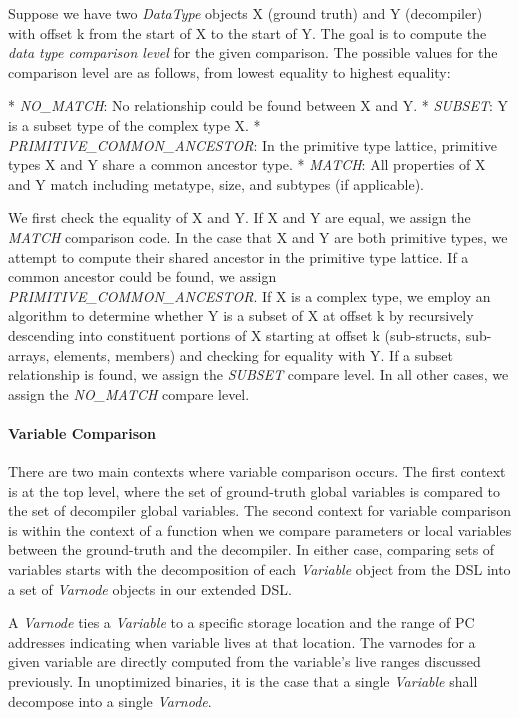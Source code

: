 \documentclass[conference]{IEEEtran}
\begin{document}

Suppose we have two \emph{DataType} objects X (ground truth) and Y (decompiler) with offset k from the start of X to the start of Y. The goal is to compute the \emph{data type comparison level} for the given comparison. The possible values for the comparison level are as follows, from lowest equality to highest equality:

* \emph{NO\_MATCH}: No relationship could be found between X and Y.
* \emph{SUBSET}: Y is a subset type of the complex type X.
* \emph{PRIMITIVE\_COMMON\_ANCESTOR}: In the primitive type lattice, primitive types X and Y share a common ancestor type.
* \emph{MATCH}: All properties of X and Y match including metatype, size, and subtypes (if applicable).

We first check the equality of X and Y. If X and Y are equal, we assign the \emph{MATCH} comparison code. In the case that X and Y are both primitive types, we attempt to compute their shared ancestor in the primitive type lattice. If a common ancestor could be found, we assign \emph{PRIMITIVE\_COMMON\_ANCESTOR}. If X is a complex type, we employ an algorithm to determine whether Y is a subset of X at offset k by recursively descending into constituent portions of X starting at offset k (sub-structs, sub-arrays, elements, members) and checking for equality with Y. If a subset relationship is found, we assign the \emph{SUBSET} compare level. In all other cases, we assign the \emph{NO\_MATCH} compare level.

\paragraph{Variable Comparison}

There are two main contexts where variable comparison occurs. The first context is at the top level, where the set of ground-truth global variables is compared to the set of decompiler global variables. The second context for variable comparison is within the context of a function when we compare parameters or local variables between the ground-truth and the decompiler. In either case, comparing sets of variables starts with the decomposition of each \emph{Variable} object from the DSL into a set of \emph{Varnode} objects in our extended DSL.

A \emph{Varnode} ties a \emph{Variable} to a specific storage location and the range of PC addresses indicating when variable lives at that location. The varnodes for a given variable are directly computed from the variable's live ranges discussed previously. In unoptimized binaries, it is the case that a single \emph{Variable} shall decompose into a single \emph{Varnode}.
\end{document}
